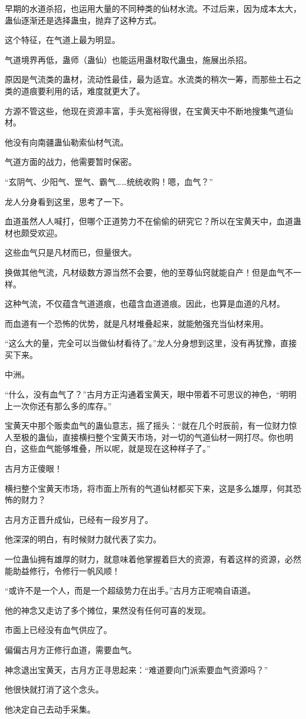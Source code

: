 \begin{this_body}
早期的水道杀招，也运用大量的不同种类的仙材水流。不过后来，因为成本太大，蛊仙逐渐还是选择蛊虫，抛弃了这种方式。

这个特征，在气道上最为明显。

气道境界再低，蛊师（蛊仙）也能运用蛊材取代蛊虫，施展出杀招。

原因是气流类的蛊材，流动性最佳，最为适宜。水流类的稍次一筹，而那些土石之类的道痕要利用的话，难度就更大了。

方源不管这些，他现在资源丰富，手头宽裕得很，在宝黄天中不断地搜集气道仙材。

他没有向南疆蛊仙勒索仙材气流。

气道方面的战力，他需要暂时保密。

“玄阴气、少阳气、罡气、霸气……统统收购！嗯，血气？”

龙人分身看到这里，思考了一下。

血道虽然人人喊打，但哪个正道势力不在偷偷的研究它？所以在宝黄天中，血道蛊材也颇受欢迎。

这些血气只是凡材而已，但量很大。

换做其他气流，凡材级数方源当然不会要，他的至尊仙窍就能自产！但是血气不一样。

这种气流，不仅蕴含气道道痕，也蕴含血道道痕。因此，也算是血道的凡材。

而血道有一个恐怖的优势，就是凡材堆叠起来，就能勉强充当仙材来用。

“这么大的量，完全可以当做仙材看待了。”龙人分身想到这里，没有再犹豫，直接买下来。

中洲。

“什么，没有血气了？”古月方正沟通着宝黄天，眼中带着不可思议的神色，“明明上一次你还有那么多的库存。”

宝黄天中那个贩卖血气的蛊仙意志，摇了摇头：“就在几个时辰前，有一位财力惊人至极的蛊仙，直接横扫整个宝黄天市场，对一切的气道仙材一网打尽。你也明白，这些血气能够堆叠，所以呢，就是现在这种样子了。”

古月方正傻眼！

横扫整个宝黄天市场，将市面上所有的气道仙材都买下来，这是多么雄厚，何其恐怖的财力？

古月方正晋升成仙，已经有一段岁月了。

他深深的明白，有时候财力就代表了实力。

一位蛊仙拥有雄厚的财力，就意味着他掌握着巨大的资源，有着这样的资源，必然能助益修行，令修行一帆风顺！

“或许不是一个人，而是一个超级势力在出手。”古月方正呢喃自语道。

他的神念又走访了多个摊位，果然没有任何可喜的发现。

市面上已经没有血气供应了。

偏偏古月方正修行血道，需要血气。

神念退出宝黄天，古月方正寻思起来：“难道要向门派索要血气资源吗？”

他很快就打消了这个念头。

他决定自己去动手采集。

\end{this_body}

